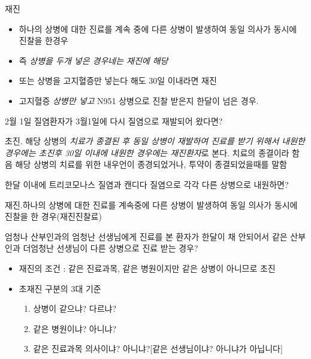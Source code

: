 \begin{commentbox}{재진}
\begin{itemize}\tightlist
\item 하나의 상병에 대한 진료를 계속 중에 다른 상병이 발생하여 동일 의사가 동시에 진찰을 한경우
\item 즉 \emph{상병을 두개 넣은 경우네는 재진에 해당}
\item 또는 상병을 고지혈증만 넣는다 해도 30일 이내라면 재진
\end{itemize}
\begin{itemize}\tightlist
\item 고지혈증 \emph{상병만 넣고} N951 상병으로 진찰 받은지 한달이 넘은 경우.
\end{itemize}
\end{commentbox}

2월 1일 질염환자가 3월1일에 다시 질염으로 재발되어 왔다면? 
\begin{quotebox}
초진. 해당 상병의 \emph{치료가 종결된 후 동일 상병이 재발하여 진료를 받기 위해서 내원한 경우에는 초진후 30일 이내에 내원한 경우에는 재진환자}로 본다. 치료의 종결이라 함음 해당 상병의 치료를 위한 내우언이 종경되었거나, 투약이 종결되었을때를 말함
\end{quotebox}

한달 이내에 트리코모나스 질염과 캔디다 질염으로 각각 다른 상병으로 내원하면? 
\begin{quotebox}
재진.하나의 상병에 대한 진료를 계속중에 다른 상병이 발생하여 동일 의사가 동시에 진찰을 한 경우(재진진찰료)
\end{quotebox}

엄청나 산부인과의 엄청난 선생님에게 진료를 본 환자가 한달이 채 안되어서 같은 산부인과 더엄청난 선생님이 다른 상병으로 진료 받는 경우?
\begin{commentbox}{}
\begin{itemize}\tightlist
\item 재진의 조건 : 같은 진료과목, 같은 병원이지만 같은 상병이 아니므로 초진
\item 초재진 구분의 3대 기준 
	\begin{enumerate}\tightlist
	\item 상병이 같으냐? 다르냐?
	\item 같은 병원이냐? 아니냐?
	\item 같은 진료과목 의사이냐? 아니냐?[같은 선생님이냐? 아니냐가 아닙니다]
	\end{enumerate}
\end{itemize}
\end{commentbox}

